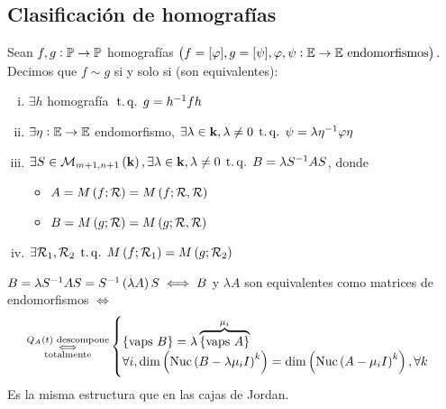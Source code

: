 \subsection{Clasificación de homografías}

\begin{defi}
	Sean $f, g : \mathbb{P} \to \mathbb{P}$ homografías $\left( f = [\varphi], g = [\psi], \varphi, \psi : \mathbb{E} \to \mathbb{E} \text{ endomorfismos}\right).$ Decimos que $f \sim g$ si y solo si (son equivalentes):
	\begin{enumerate}[(i)]
		\item $\exists h$ homografía $\operatorname{\;t.q.\;} g = h^{-1}fh$
		\item $\exists \eta : \mathbb{E} \to \mathbb{E}$ endomorfismo, $\exists \lambda \in \mathbf{k}, \lambda \neq 0 \operatorname{\;t.q.\;} \psi = \lambda \eta^{-1} \varphi \eta$
		\item $\exists S \in \mathcal{M}_{m+1, n+1}\left(\mathbf{k}\right), \exists \lambda\in\mathbf{k}, \lambda \neq 0 \operatorname{\;t.q.\;} B = \lambda S^{-1} A S$, donde
		\begin{itemize}
			\item $A = M\left( f; \mathcal{R}\right) = M\left( f; \mathcal{R},\mathcal{R}\right)$
			\item $B = M\left( g; \mathcal{R}\right) = M\left( g; \mathcal{R},\mathcal{R}\right)$
		\end{itemize}
		\item $\exists \mathcal{R}_1,\mathcal{R}_2\operatorname{\;t.q.\;} M\left( f;\mathcal{R}_1\right) = M \left( g; \mathcal{R}_2\right)$
	\end{enumerate}
\end{defi}
\begin{obs}
	$B = \lambda S^{-1} A S = S^{-1} \left( \lambda A \right) S \iff B$ y $\lambda A$ son equivalentes como matrices de endomorfismos $\iff$
	\[
		\substack{Q_A\left( t \right) \text{ descompone} \\ \iff \\ \text{totalmente}}
		\begin{cases}
			\{ \text{vaps } B \} = \lambda \overbrace{\{ \text{vaps } A \}}^{\mu_i} \\
			\forall i, \dim \left( \text{Nuc}\left( B - \lambda \mu_i I\right)^k \right) = \dim \left(\text{Nuc}\left( A - \mu_i I \right) ^k \right), \forall k
		\end{cases}
	\]
	Es la misma estructura que en las cajas de Jordan.
\end{obs}
